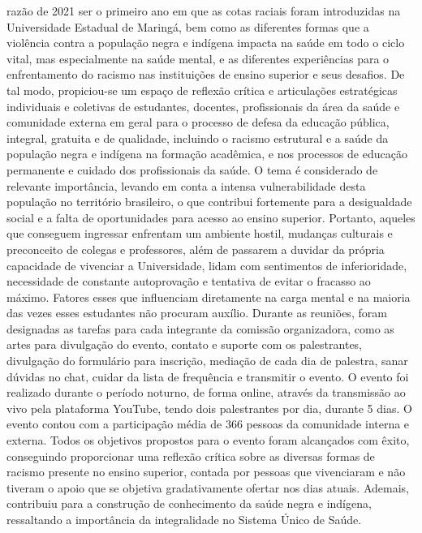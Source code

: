 razão de 2021 ser o primeiro ano em que as cotas raciais foram introduzidas na Universidade Estadual de Maringá, bem como as diferentes formas que a violência contra a população negra e indígena impacta na saúde em todo o ciclo vital, mas especialmente na saúde mental, e as diferentes experiências para o enfrentamento do racismo nas instituições de ensino superior e seus desafios. De tal modo, propiciou-se um espaço de reflexão crítica e articulações estratégicas individuais e coletivas de estudantes, docentes, profissionais da área da saúde e comunidade externa em geral para o processo de defesa da educação pública, integral, gratuita e
de qualidade, incluindo o racismo estrutural e a saúde da população negra e indígena na formação acadêmica, e nos processos de educação permanente e cuidado dos profissionais da saúde. O tema é considerado de relevante importância, levando em conta a intensa vulnerabilidade desta população no território brasileiro, o que contribui fortemente para a desigualdade social e a falta de oportunidades para acesso ao ensino superior. Portanto, aqueles que conseguem ingressar enfrentam um ambiente hostil, mudanças culturais e preconceito de colegas e professores, além de passarem a duvidar da própria capacidade de vivenciar a Universidade, lidam com sentimentos de inferioridade, necessidade de constante autoprovação e tentativa de evitar o fracasso ao máximo. Fatores esses que influenciam diretamente na carga mental e na maioria das vezes esses estudantes não procuram auxílio. Durante as reuniões, foram designadas as tarefas para cada integrante da comissão organizadora, como as artes para divulgação do evento, contato e suporte com os palestrantes, divulgação do formulário para inscrição, mediação de cada dia de palestra, sanar dúvidas no chat, cuidar da lista de frequência e transmitir o evento. O evento foi realizado durante o período noturno, de forma online, através da transmissão ao vivo pela plataforma YouTube, tendo dois palestrantes por dia, durante 5 dias. O evento contou com a participação média de 366 pessoas da comunidade interna e externa. Todos os objetivos propostos para o evento foram alcançados com êxito, conseguindo proporcionar uma reflexão crítica sobre as diversas formas de racismo presente no ensino superior, contada por pessoas que vivenciaram e não tiveram o apoio que se objetiva gradativamente ofertar nos dias atuais. Ademais, contribuiu para a construção de conhecimento da saúde negra e indígena, ressaltando a importância da integralidade no Sistema Único de Saúde.

